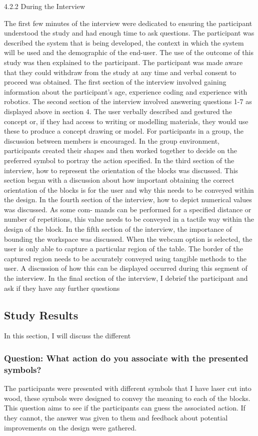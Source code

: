 \documentclass[oneside,%
                    author={Malak Hajji},
                    degree={BSc},
                    title={Designing An Accessible Computational Toolkit For Students},
                  subtitle={With Mixed Visual Abilities}]{dissertation}
\begin{document}
4.2.2 During the Interview

The first few minutes of the interview were dedicated to ensuring the participant understood the study and had enough time to ask questions. The participant was described the system that is being developed, the context in which the system will be used and the demographic of the end-user. The use of the outcome of this study was then explained to the participant. The participant was made aware that they could withdraw from the study at any time and verbal consent to proceed was obtained. 
The first section of the interview involved gaining information about the participant’s age, experience coding and experience with robotics.
The second section of the interview involved answering questions 1-7 as displayed above in section
4. The user verbally described and gestured the concept or, if they had access to writing or modelling materials, they would use these to produce a concept drawing or model. For participants in a group, the discussion between members is encouraged. In the group environment, participants created their shapes and then worked together to decide on the preferred symbol to portray the action specified.
In the third section of the interview, how to represent the orientation of the blocks was discussed. This section began with a discussion about how important obtaining the correct orientation of the blocks is for the user and why this needs to be conveyed within the design.
In the fourth section of the interview, how to depict numerical values was discussed. As some com- mands can be performed for a specified distance or number of repetitions, this value needs to be conveyed in a tactile way within the design of the block.
In the fifth section of the interview, the importance of bounding the workspace was discussed. When the webcam option is selected, the user is only able to capture a particular region of the table. The border of the captured region needs to be accurately conveyed using tangible methods to the user. A discussion of how this can be displayed occurred during this segment of the interview.
In the final section of the interview, I debrief the participant and ask if they have any further questions

\subsection{Study Results}
In this section, I will discuss the different 


\subsubsection{Question: What action do you associate with the presented symbols?}
The participants were presented with different symbols that I have laser cut into wood, these symbols were designed to convey the meaning to each of the blocks. This question aims to see if the participants can guess the associated action. If they cannot, the answer was given to them and feedback about potential improvements on the design were gathered. 
\end{document}
